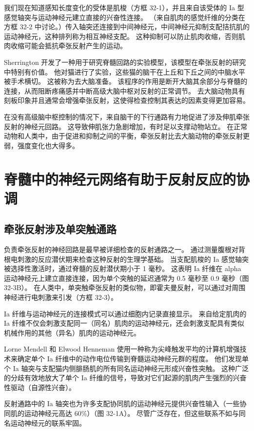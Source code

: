 我们现在知道感知长度变化的受体是肌梭（方框 32-1），并且来自该受体的 Ia 型感觉轴突与运动神经元建立直接的兴奋性连接。 （来自肌肉的感觉纤维的分类在方框 32-2 中讨论。）传入轴突还连接到中间神经元，中间神经元抑制支配拮抗肌的运动神经元，这种排列称为相互神经支配。 这种抑制可以防止肌肉收缩，否则肌肉收缩可能会抵抗牵张反射产生的运动。

Sherrington 开发了一种用于研究脊髓回路的实验模型，该模型在牵张反射的研究中特别有价值。 他对猫进行了实验，这些猫的脑干在上丘和下丘之间的中脑水平被手术横切。 这被称为去大脑准备。 该程序的作用是断开大脑其余部分与脊髓的连接，从而阻断疼痛感并中断高级大脑中枢对反射的正常调节。 去大脑动物具有刻板印象并且通常会增强牵张反射，这使得检查控制其表达的因素变得更加容易。

在没有高级脑中枢控制的情况下，来自脑干的下行通路有力地促进了涉及伸肌牵张反射的神经元回路。 这导致伸肌张力急剧增加，有时足以支撑动物站立。 在正常动物和人类中，由于促进和抑制之间的平衡，牵张反射比去大脑动物的牵张反射更弱，强度变化也大得多。


\section{脊髓中的神经元网络有助于反射反应的协调}

\subsection{牵张反射涉及单突触通路}
负责牵张反射的神经回路是最早被详细检查的反射通路之一。 通过测量腹根对背根电刺激的反应潜伏期来检查这种反射的生理学基础。 当支配肌梭的 Ia 感觉轴突被选择性激活时，通过脊髓的反射潜伏期小于 1 毫秒。 这表明 Ia 纤维在 alpha 运动神经元上建立直接连接，因为单个突触的延迟通常为 0.5 毫秒至 0.9 毫秒（图 32-3B）。 在人类中，单突触牵张反射的类似物，即霍夫曼反射，可以通过对周围神经进行电刺激来引发（方框 32-3）。

Ia 纤维与运动神经元的连接模式可以通过细胞内记录直接显示。 来自给定肌肉的 Ia 纤维不仅会刺激支配同一（同名）肌肉的运动神经元，还会刺激支配具有类似机械作用的其他（异名）肌肉的运动神经元。

Lorne Mendell 和 Elwood Henneman 使用一种称为尖峰触发平均的计算机增强技术来确定单个 Ia 纤维中的动作电位传输到脊髓运动神经元群的程度。 他们发现单个 Ia 轴突与支配猫内侧腓肠肌的所有同名运动神经元形成兴奋性突触。 这种广泛的分歧有效地放大了单个 Ia 纤维的信号，导致对它们起源的肌肉产生强烈的兴奋性驱动（自源性兴奋）。

反射通路中的 Ia 轴突也为许多支配协同肌的运动神经元提供兴奋性输入（一些协同肌的运动神经元高达 60\%）（图 32-1A）。 尽管广泛存在，但这些联系不如与同名运动神经元的联系牢固。

